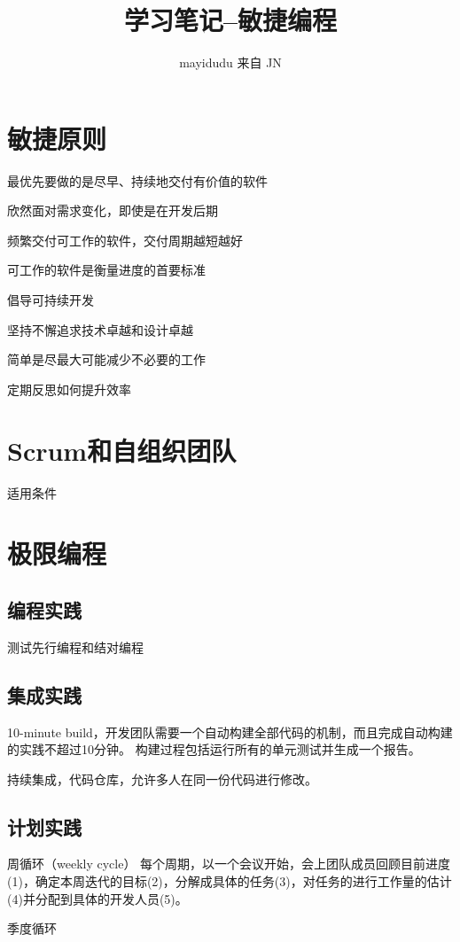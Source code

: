 \documentclass{ctexart}
\newcommand{\jn}{JN}
\begin{document}
\title{学习笔记--敏捷编程}
\author{mayidudu 来自 \jn}
\maketitle

\section{敏捷原则}
最优先要做的是尽早、持续地交付有价值的软件

欣然面对需求变化，即使是在开发后期

频繁交付可工作的软件，交付周期越短越好

可工作的软件是衡量进度的首要标准

倡导可持续开发

坚持不懈追求技术卓越和设计卓越

简单是尽最大可能减少不必要的工作

定期反思如何提升效率


\section{Scrum和自组织团队}

适用条件

\section{极限编程}
\subsection{编程实践}
测试先行编程和结对编程
\subsection{集成实践}
10-minute build，开发团队需要一个自动构建全部代码的机制，而且完成自动构建的实践不超过10分钟。
构建过程包括运行所有的单元测试并生成一个报告。

持续集成，代码仓库，允许多人在同一份代码进行修改。

\subsection{计划实践}
周循环（weekly cycle）
每个周期，以一个会议开始，会上团队成员回顾目前进度(1)，确定本周迭代的目标(2)，分解成具体的任务(3)，对任务的进行工作量的估计(4)并分配到具体的开发人员(5)。

季度循环
\end{document}
